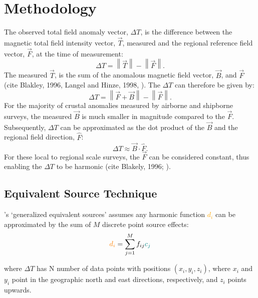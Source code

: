 \section{Methodology}
The observed total field anomaly vector, $\Delta T$, is the difference between the magnetic total field intensity vector, $\vec{T}$, measured and the regional reference field vector, $\vec{F}$, at the time of measurement:
\begin{equation}
    \Delta T = \left\lVert \vec{T} \right\rVert - \left\lVert \vec{F} \right\rVert.
\end{equation}
The measured $\vec{T}$, is the sum of the anomalous magnetic field vector, $\vec{B}$, and $\vec{F}$ (cite Blakley, 1996, Langel and Hinze, 1998, \citet{OliveiraJr2015}). The $\Delta T$ can therefore be given by:
\begin{equation}
    \Delta T = \left\lVert \vec{F} + \vec{B} \right\rVert - \left\lVert \vec{F} \right\rVert.
\end{equation}
For the majority of crustal anomalies measured by airborne and shipborne surveys, the measured $\vec{B}$ is much smaller in magnitude compared to the $\vec{F}$. Subsequently, $\Delta T$ can be approximated as the dot product of the $\vec{B}$ and the regional field direction, $\hat{F}$:
\begin{equation}
    \Delta T\approx  \vec{B} \cdot \hat{F}.
\end{equation}
For these local to regional scale surveys, the $\vec{F}$ can be considered constant, thus enabling the $\Delta T$ to be harmonic (cite Blakely, 1996; \citet{OliveiraJr2015}).

\subsection{Equivalent Source Technique}
\cite{Cordell1992}'s ‘generalized equivalent sources’ assumes any harmonic function \textcolor{orange}{$d_i$} can be approximated by the sum of $M$ discrete point source effects:
\begin{equation}
\textcolor{orange}{d_i} = \sum_{j=1}^{M}  f_{ij} \textcolor{teal}{c_j}
\end{equation}


where $\Delta T$ has N number of data points with positions $(x_i, y_i, z_i)$, where $x_i$ and $y_i$ point in the geographic north and east directions, respectively, and $z_i$ points upwards.


